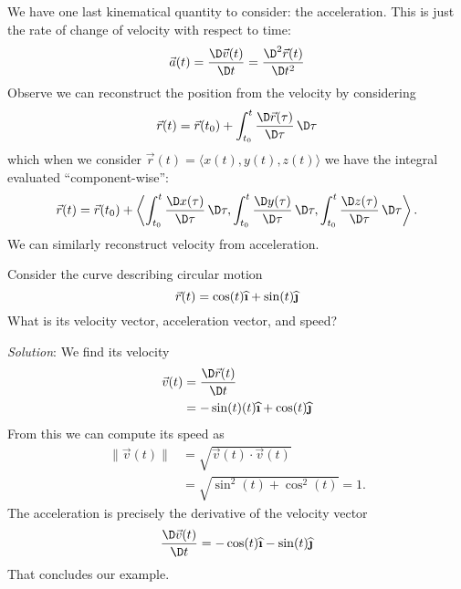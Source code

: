 We have one last kinematical quantity to consider: the
acceleration. This is just the rate of change of velocity with
respect to time:
\begin{equation}
\vec{a}(t) = \frac{\D\vec{v}(t)}{\D t} =
\frac{\D^{2}\vec{r}(t)}{\D t^{2}}
\end{equation}
Observe we can reconstruct the position from the velocity by
considering
\begin{equation}
\vec{r}(t) = \vec{r}(t_{0}) +
\int^{t}_{t_{0}}\frac{\D\vec{r}(\tau)}{\D\tau}\,\D\tau
\end{equation}
which when we consider $\vec{r}(t)=\langle x(t),y(t),z(t)\rangle$
we have the integral evaluated ``component-wise'':
\begin{equation}
\vec{r}(t) = \vec{r}(t_{0}) +
\left\langle \int^{t}_{t_{0}}\frac{\D x(\tau)}{\D\tau}\,\D\tau,
\int^{t}_{t_{0}}\frac{\D y(\tau)}{\D\tau}\,\D\tau,
\int^{t}_{t_{0}}\frac{\D z(\tau)}{\D\tau}\,\D\tau\right\rangle.
\end{equation}
We can similarly reconstruct velocity from acceleration.

\begin{example}
Consider the curve describing circular motion
\begin{equation}
\vec{r}(t) = \cos(t)\widehat{\textbf{\i}}
+\sin(t)\widehat{\textbf{\j}}
\end{equation}
What is its velocity vector, acceleration vector, and speed?

\emph{Solution}: We find its velocity
\begin{equation}
\begin{aligned}
\vec{v}(t) &= \frac{\D\vec{r}(t)}{\D t}\\
&=-\sin(t)(t)\widehat{\textbf{\i}}
+\cos(t)\widehat{\textbf{\j}}
\end{aligned}
\end{equation}
From this we can compute its speed as
\begin{equation}
\begin{aligned}
\|\vec{v}(t)\| &= \sqrt{\vec{v}(t)\cdot\vec{v}(t)}\\
&=\sqrt{\sin^{2}(t)+\cos^{2}(t)} = 1.
\end{aligned}
\end{equation}
The acceleration is precisely the derivative of the velocity
vector
\begin{equation}
\frac{\D\vec{v}(t)}{\D t}
= -\cos(t)\widehat{\textbf{\i}}-\sin(t)\widehat{\textbf{\j}}
\end{equation}
That concludes our example.
\end{example}

